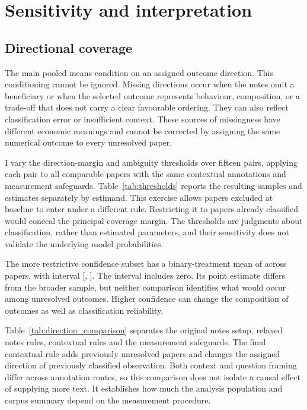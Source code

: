 \documentclass[11pt]{article}
\begin{document}
\section{Sensitivity and interpretation}\label{sec:sensitivity}
\subsection{Directional coverage}
The main pooled means condition on an assigned outcome direction. This conditioning cannot be ignored. Missing directions occur when the notes omit a beneficiary or when the selected outcome represents behaviour, composition, or a trade-off that does not carry a clear favourable ordering. They can also reflect classification error or insufficient context. These sources of missingness have different economic meanings and cannot be corrected by assigning the same numerical outcome to every unresolved paper.

I vary the direction-margin and ambiguity thresholds over fifteen pairs, applying each pair to all comparable papers with the same contextual annotations and measurement safeguards. Table~\ref{tab:thresholds} reports the resulting samples and estimates separately by estimand. This exercise allows papers excluded at baseline to enter under a different rule. Restricting it to papers already classified would conceal the principal coverage margin. The thresholds are judgments about classification, rather than estimated parameters, and their sensitivity does not validate the underlying model probabilities.

The more restrictive confidence subset has a binary-treatment mean of \BinaryStrictMean{} across \BinaryStrictN{} papers, with interval [\BinaryStrictLo{}, \BinaryStrictHi{}]. The interval includes zero. Its point estimate differs from the broader sample, but neither comparison identifies what would occur among unresolved outcomes. Higher confidence can change the composition of outcomes as well as classification reliability.

Table~\ref{tab:direction_comparison} separates the original notes setup, relaxed notes rules, contextual rules and the measurement safeguards. The final contextual rule adds \NewlyOrientedN{} previously unresolved papers and changes the assigned direction of \ReversedDirectionN{} previously classified observation. Both context and question framing differ across annotation routes, so this comparison does not isolate a causal effect of supplying more text. It establishes how much the analysis population and corpus summary depend on the measurement procedure.
\end{document}
